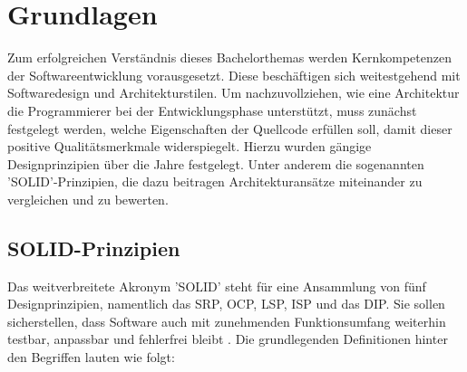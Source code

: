 

\chapter{Grundlagen}

Zum erfolgreichen Verständnis dieses Bachelorthemas werden Kernkompetenzen der Softwareentwicklung vorausgesetzt. Diese beschäftigen sich weitestgehend mit Softwaredesign und Architekturstilen. Um nachzuvollziehen, wie eine Architektur die Programmierer bei der Entwicklungsphase unterstützt, muss zunächst festgelegt werden, welche Eigenschaften der Quellcode erfüllen soll, damit dieser positive Qualitätsmerkmale widerspiegelt. Hierzu wurden gängige Designprinzipien über die Jahre festgelegt. Unter anderem die sogenannten 'SOLID'-Prinzipien, die dazu beitragen Architekturansätze miteinander zu vergleichen und zu bewerten.

\section{SOLID-Prinzipien}

Das weitverbreitete Akronym 'SOLID' steht für eine Ansammlung von fünf Designprinzipien, namentlich das \acrfull{SRP}, \acrfull{OCP}, \acrfull{LSP}, \acrfull{ISP} und das \acrfull{DIP}. Sie sollen sicherstellen, dass Software auch mit zunehmenden Funktionsumfang weiterhin testbar, anpassbar und fehlerfrei bleibt \cite{Martin.2000, Martin.2018}. Die grundlegenden Definitionen hinter den Begriffen lauten wie folgt:

